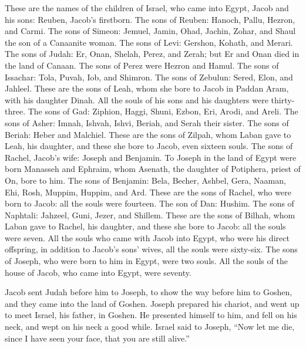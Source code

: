  These are the names of the children of Israel, who came
into Egypt, Jacob and his sons: Reuben, Jacob's firstborn. 
The sons of Reuben: Hanoch, Pallu, Hezron, and Carmi.  The
sons of Simeon: Jemuel, Jamin, Ohad, Jachin, Zohar, and Shaul the son of
a Canaanite woman.  The sons of Levi: Gershon, Kohath, and
Merari.  The sons of Judah: Er, Onan, Shelah, Perez, and
Zerah; but Er and Onan died in the land of Canaan. The sons of Perez
were Hezron and Hamul.  The sons of Issachar: Tola, Puvah,
Iob, and Shimron.  The sons of Zebulun: Sered, Elon, and
Jahleel.  These are the sons of Leah, whom she bore to
Jacob in Paddan Aram, with his daughter Dinah. All the souls of his sons
and his daughters were thirty-three.  The sons of Gad:
Ziphion, Haggi, Shuni, Ezbon, Eri, Arodi, and Areli.  The
sons of Asher: Imnah, Ishvah, Ishvi, Beriah, and Serah their sister. The
sons of Beriah: Heber and Malchiel.  These are the sons of
Zilpah, whom Laban gave to Leah, his daughter, and these she bore to
Jacob, even sixteen souls.  The sons of Rachel, Jacob's
wife: Joseph and Benjamin.  To Joseph in the land of Egypt
were born Manasseh and Ephraim, whom Asenath, the daughter of Potiphera,
priest of On, bore to him.  The sons of Benjamin: Bela,
Becher, Ashbel, Gera, Naaman, Ehi, Rosh, Muppim, Huppim, and Ard.
 These are the sons of Rachel, who were born to Jacob: all
the souls were fourteen.  The son of Dan: Hushim.
 The sons of Naphtali: Jahzeel, Guni, Jezer, and Shillem.
 These are the sons of Bilhah, whom Laban gave to Rachel,
his daughter, and these she bore to Jacob: all the souls were seven.
 All the souls who came with Jacob into Egypt, who were his
direct offspring, in addition to Jacob's sons' wives, all the souls were
sixty-six.  The sons of Joseph, who were born to him in
Egypt, were two souls. All the souls of the house of Jacob, who came
into Egypt, were seventy.

 Jacob sent Judah before him to Joseph, to show the way
before him to Goshen, and they came into the land of Goshen.
 Joseph prepared his chariot, and went up to meet Israel,
his father, in Goshen. He presented himself to him, and fell on his
neck, and wept on his neck a good while.  Israel said to
Joseph, ``Now let me die, since I have seen your face, that you are
still alive.''

